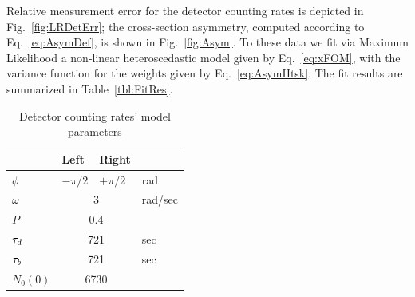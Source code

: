 \documentclass{jacow}
\begin{document}
Relative measurement error for the detector counting rates is depicted in Fig.~\ref{fig:LRDetErr}; the cross-section asymmetry, computed according to Eq.~\eqref{eq:AsymDef}, is shown in Fig.~\ref{fig:Asym}.
To these data we fit via Maximum Likelihood a non-linear heteroscedastic model %
given by Eq.~\eqref{eq:xFOM}, with the variance function for the weights given by Eq.~\eqref{eq:AsymHtsk}. The fit results are summarized in Table~\ref{tbl:FitRes}.
\begin{table}[h]
	\caption{Detector counting rates' model parameters\label{tbl:DetCntRtParam}}
	\centering
	\begin{tabular}{llll}
		\hline
		&   Left   &     Right     &  \\ \hline
		$\phi$  & $-\pi/2$ &   $+\pi/2$    &   rad   \\
		$\omega$ &  \multicolumn{2}{c}{3}   & rad/sec \\
		$P$    & \multicolumn{2}{c}{0.4}  &  \\
		$\tau_d$  & \multicolumn{2}{c}{721}  &   sec   \\
		$\tau_b$  & \multicolumn{2}{c}{721}  &   sec   \\
		$N_0(0)$ & \multicolumn{2}{c}{6730} &  \\ \hline
	\end{tabular}
\end{table}
\end{document}
